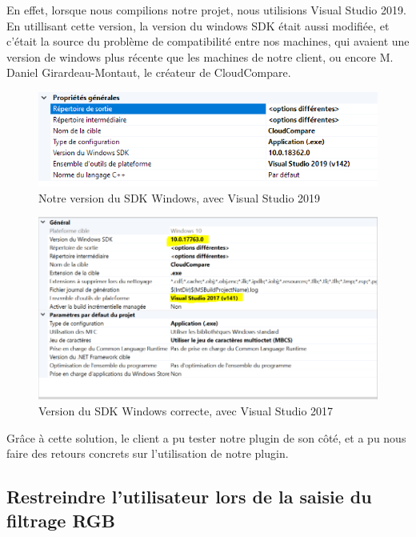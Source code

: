 \documentclass[12pt,titlepage,french]{article}
\begin{document}
En effet, lorsque nous compilions notre projet, nous utilisions Visual Studio 2019. En utillisant cette version, la version du windows SDK était aussi modifiée, et c'était la source du problème de compatibilité entre nos machines, qui avaient une version de windows plus récente que les machines de notre client, ou encore M. Daniel Girardeau-Montaut, le créateur de CloudCompare.

\begin{figure}[H]
 \caption{\label{} Notre version du SDK Windows, avec Visual Studio 2019}
 \begin{center}
 \includegraphics[width=1\textwidth]{./img/vs2019.PNG}
  \end{center}
\end{figure}


\begin{figure}[H]
 \caption{\label{} Version du SDK Windows correcte, avec Visual Studio 2017}
 \begin{center}
 \includegraphics[width=1\textwidth]{./img/vs2017.PNG}
  \end{center}
\end{figure}

Grâce à cette solution, le client a pu tester notre plugin de son côté, et a pu nous faire des retours concrets sur l'utilisation de notre plugin.

\subsection{Restreindre l'utilisateur lors de la saisie du filtrage RGB}
\end{document}
